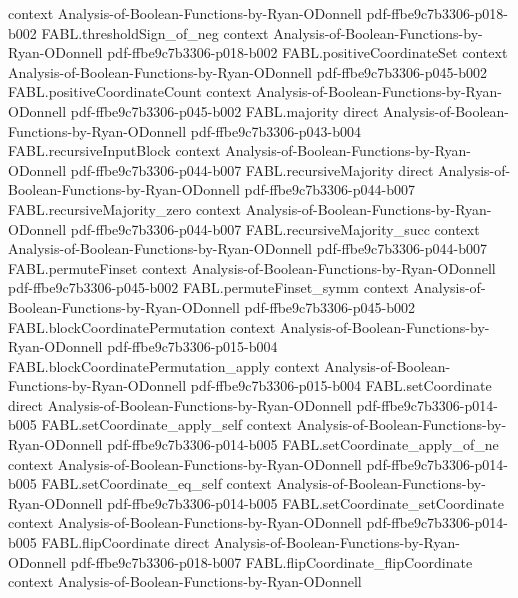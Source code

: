 \begin{theorem}
  {context}
  {Analysis-of-Boolean-Functions-by-Ryan-ODonnell}
  {pdf-ffbe9c7b3306-p018-b002}
\proofstep
  {FABL.thresholdSign_of_neg}
  {context}
  {Analysis-of-Boolean-Functions-by-Ryan-ODonnell}
  {pdf-ffbe9c7b3306-p018-b002}
\proofstep
  {FABL.positiveCoordinateSet}
  {context}
  {Analysis-of-Boolean-Functions-by-Ryan-ODonnell}
  {pdf-ffbe9c7b3306-p045-b002}
\proofstep
  {FABL.positiveCoordinateCount}
  {context}
  {Analysis-of-Boolean-Functions-by-Ryan-ODonnell}
  {pdf-ffbe9c7b3306-p045-b002}
\proofstep
  {FABL.majority}
  {direct}
  {Analysis-of-Boolean-Functions-by-Ryan-ODonnell}
  {pdf-ffbe9c7b3306-p043-b004}
\proofstep
  {FABL.recursiveInputBlock}
  {context}
  {Analysis-of-Boolean-Functions-by-Ryan-ODonnell}
  {pdf-ffbe9c7b3306-p044-b007}
\proofstep
  {FABL.recursiveMajority}
  {direct}
  {Analysis-of-Boolean-Functions-by-Ryan-ODonnell}
  {pdf-ffbe9c7b3306-p044-b007}
\proofstep
  {FABL.recursiveMajority_zero}
  {context}
  {Analysis-of-Boolean-Functions-by-Ryan-ODonnell}
  {pdf-ffbe9c7b3306-p044-b007}
\proofstep
  {FABL.recursiveMajority_succ}
  {context}
  {Analysis-of-Boolean-Functions-by-Ryan-ODonnell}
  {pdf-ffbe9c7b3306-p044-b007}
\proofstep
  {FABL.permuteFinset}
  {context}
  {Analysis-of-Boolean-Functions-by-Ryan-ODonnell}
  {pdf-ffbe9c7b3306-p045-b002}
\proofstep
  {FABL.permuteFinset_symm}
  {context}
  {Analysis-of-Boolean-Functions-by-Ryan-ODonnell}
  {pdf-ffbe9c7b3306-p045-b002}
\proofstep
  {FABL.blockCoordinatePermutation}
  {context}
  {Analysis-of-Boolean-Functions-by-Ryan-ODonnell}
  {pdf-ffbe9c7b3306-p015-b004}
\proofstep
  {FABL.blockCoordinatePermutation_apply}
  {context}
  {Analysis-of-Boolean-Functions-by-Ryan-ODonnell}
  {pdf-ffbe9c7b3306-p015-b004}
\proofstep
  {FABL.setCoordinate}
  {direct}
  {Analysis-of-Boolean-Functions-by-Ryan-ODonnell}
  {pdf-ffbe9c7b3306-p014-b005}
\proofstep
  {FABL.setCoordinate_apply_self}
  {context}
  {Analysis-of-Boolean-Functions-by-Ryan-ODonnell}
  {pdf-ffbe9c7b3306-p014-b005}
\proofstep
  {FABL.setCoordinate_apply_of_ne}
  {context}
  {Analysis-of-Boolean-Functions-by-Ryan-ODonnell}
  {pdf-ffbe9c7b3306-p014-b005}
\proofstep
  {FABL.setCoordinate_eq_self}
  {context}
  {Analysis-of-Boolean-Functions-by-Ryan-ODonnell}
  {pdf-ffbe9c7b3306-p014-b005}
\proofstep
  {FABL.setCoordinate_setCoordinate}
  {context}
  {Analysis-of-Boolean-Functions-by-Ryan-ODonnell}
  {pdf-ffbe9c7b3306-p014-b005}
\proofstep
  {FABL.flipCoordinate}
  {direct}
  {Analysis-of-Boolean-Functions-by-Ryan-ODonnell}
  {pdf-ffbe9c7b3306-p018-b007}
\proofstep
  {FABL.flipCoordinate_flipCoordinate}
  {context}
  {Analysis-of-Boolean-Functions-by-Ryan-ODonnell}

\end{theorem}
